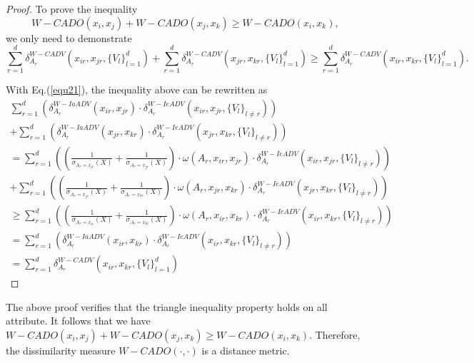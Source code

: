 \documentclass[review]{elsarticle}
\newtheorem{proof}{Proof}
\begin{document}
\begin{proof}
To prove the inequality $$W-CADO(x_i,x_j) + W-CADO(x_j,x_k) \geq W-CADO(x_i,x_k),$$ we only need to demonstrate
$$\sum_{r=1}^{d}\delta_{A_r}^{W-CADV}(x_{ir},x_{jr},\{V_l\}_{l = 1} ^ d)+\sum_{r=1}^{d}\delta_{A_r}^{W-CADV}(x_{jr},x_{kr},\{V_l\}_{l = 1} ^ d) \geq \sum_{r=1}^{d}\delta_{A_r}^{W-CADV}(x_{ir},x_{kr},\{V_l\}_{l = 1} ^ d).$$

With Eq.(\ref{equ21}), the inequality above can be rewritten as
$$\begin{array}{lll}
\sum_{r=1}^{d}(\delta_{A_r}^{W-IaADV}(x_{ir},x_{jr}) \cdot \delta_{A_r}^{W-IeADV}(x_{ir},x_{jr},\{V_l\}_{l \neq r})) \\
+ \sum_{r=1}^{d}(\delta_{A_r}^{W-IaADV}(x_{jr},x_{kr}) \cdot \delta_{A_r}^{W-IeADV}(x_{jr},x_{kr},\{V_l\}_{l \neq r})) \\
= \sum_{r=1}^{d}((\frac{1}{\sigma_{A_r = x_{ir}}(X)} + \frac{1}{\sigma_{A_r = x_{jr}}(X)}) \cdot \omega(A_r,x_{ir},x_{jr}) \cdot \delta_{A_r}^{W-IeADV}(x_{ir},x_{jr},\{V_l\}_{l \neq r})) \\
+ \sum_{r=1}^{d}((\frac{1}{\sigma_{A_r = x_{jr}}(X)} + \frac{1}{\sigma_{A_r = x_{kr}}(X)}) \cdot \omega(A_r,x_{jr},x_{kr}) \cdot \delta_{A_r}^{W-IeADV}(x_{jr},x_{kr},\{V_l\}_{l \neq r})) \\
\geq \sum_{r=1}^{d}((\frac{1}{\sigma_{A_r = x_{ir}}(X)} + \frac{1}{\sigma_{A_r = x_{kr}}(X)}) \cdot \omega(A_r,x_{ir},x_{kr}) \cdot \delta_{A_r}^{W-IeADV}(x_{ir},x_{kr},\{V_l\}_{l \neq r})) \\
= \sum_{r=1}^{d}(\delta_{A_r}^{W-IaADV}(x_{ir},x_{kr}) \cdot \delta_{A_r}^{W-IeADV}(x_{ir},x_{kr},\{V_l\}_{l \neq r})) \\
= \sum_{r=1}^{d}\delta_{A_r}^{W-CADV}(x_{ir},x_{kr},\{V_l\}_{l = 1} ^ d)
\end{array}$$
\end{proof}
The above proof verifies that the triangle inequality property holds on all attribute. It follows that we have $W-CADO(x_i,x_j) + W-CADO(x_j,x_k) \geq W-CADO(x_i,x_k)$. Therefore, the dissimilarity measure $W-CADO(\cdot,\cdot)$ is a distance metric.
\end{document}
